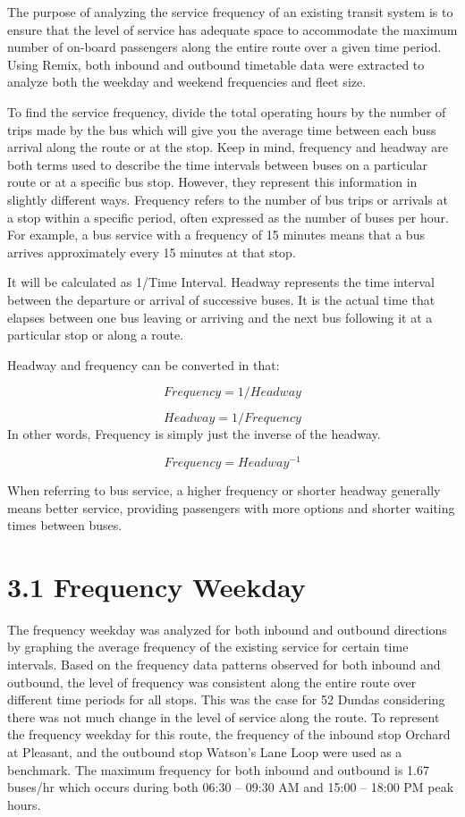 \documentclass[
11pt, %
oneside, %
english, %
singlespacing, %
]{macthesis} %
\begin{document}
The purpose of analyzing the service frequency of an existing transit system is to ensure that the level of service has adequate space to accommodate the maximum number of on-board passengers along the entire route over a given time period. Using Remix, both inbound and outbound timetable data were extracted to analyze both the weekday and weekend frequencies and fleet size.

To find the service frequency, divide the total operating hours by the number of trips made by the bus which will give you the average time between each buss arrival along the route or at the stop. Keep in mind, frequency and headway are both terms used to describe the time intervals between buses on a particular route or at a specific bus stop. However, they represent this information in slightly different ways. Frequency refers to the number of bus trips or arrivals at a stop within a specific period, often expressed as the number of buses per hour. For example, a bus service with a frequency of 15 minutes means that a bus arrives approximately every 15 minutes at that stop.

It will be calculated as 1/Time Interval. Headway represents the time interval between the departure or arrival of successive buses. It is the actual time that elapses between one bus leaving or arriving and the next bus following it at a particular stop or along a route.

Headway and frequency can be converted in that:

\[
Frequency = 1/Headway
\]

\[
Headway = 1/Frequency
\]
In other words, Frequency is simply just the inverse of the headway.

\[ Frequency = Headway^{-1} \]

When referring to bus service, a higher frequency or shorter headway generally means better service, providing passengers with more options and shorter waiting times between buses.

\hypertarget{frequency-weekday}{%
\section{3.1 Frequency Weekday}\label{frequency-weekday}}

The frequency weekday was analyzed for both inbound and outbound directions by graphing the average frequency of the existing service for certain time intervals. Based on the frequency data patterns observed for both inbound and outbound, the level of frequency was consistent along the entire route over different time periods for all stops. This was the case for 52 Dundas considering there was not much change in the level of service along the route. To represent the frequency weekday for this route, the frequency of the inbound stop Orchard at Pleasant, and the outbound stop Watson's Lane Loop were used as a benchmark. The maximum frequency for both inbound and outbound is 1.67 buses/hr which occurs during both 06:30 -- 09:30 AM and 15:00 -- 18:00 PM peak hours.
\end{document}
